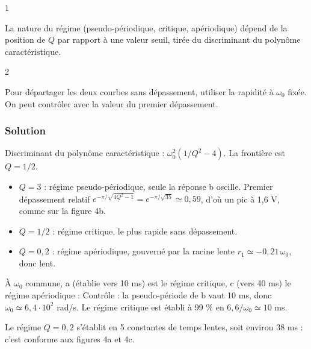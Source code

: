 \documentclass[11pt,a4paper]{article}
\providecommand{\tightlist}{\setlength{\itemsep}{0pt}\setlength{\parskip}{0pt}}
\newcommand{\equationajustee}[1]{%
  \sbox{\boiteequation}{$\displaystyle #1$}%
  \ifdim\wd\boiteequation>\linewidth
    \[\resizebox{\linewidth}{!}{\usebox{\boiteequation}}\]%
  \else
    \[#1\]%
  \fi}
\begin{document}
\begin{indication}{1}

La nature du régime (pseudo-périodique, critique, apériodique) dépend de la position de \(Q\) par rapport à une valeur seuil, tirée du discriminant du polynôme caractéristique.

\end{indication}

\begin{indication}{2}

Pour départager les deux courbes sans dépassement, utiliser la rapidité à \(\omega_0\) fixée. On peut contrôler avec la valeur du premier dépassement.

\end{indication}

\hypertarget{solution-13}{%
\subsubsection{Solution}\label{solution-13}}

Discriminant du polynôme caractéristique : \(\omega_0^2(1/Q^2-4)\). La frontière est \(Q=1/2\).

\begin{itemize}
\tightlist
\item
  \(Q=3\) : régime pseudo-périodique, seule la réponse b oscille. Premier dépassement relatif \(e^{-\pi/\sqrt{4Q^2-1}}=e^{-\pi/\sqrt{35}}\simeq0{,}59\), d'où un pic à 1,6 V, comme sur la figure 4b.
\item
  \(Q=1/2\) : régime critique, le plus rapide sans dépassement.
\item
  \(Q=0{,}2\) : régime apériodique, gouverné par la racine lente \(r_1\simeq-0{,}21\,\omega_0\), donc lent.
\end{itemize}

À \(\omega_0\) commune, a (établie vers 10 ms) est le régime critique, c (vers 40 ms) le régime apériodique :
\equationajustee{\boxed{\begin{aligned}{}&\mathbf a\leftrightarrow0{,}5\\
&\mathbf b\leftrightarrow3\\
&\mathbf c\leftrightarrow0{,}2
\end{aligned}}}
Contrôle : la pseudo-période de b vaut 10 ms, donc \(\omega_0\simeq6{,}4\cdot10^2\) rad/s. Le régime critique est établi à 99 \% en \(6{,}6/\omega_0\simeq10\) ms.

Le régime \(Q=0{,}2\) s'établit en 5 constantes de temps lentes, soit environ 38 ms : c'est conforme aux figures 4a et 4c.
\end{document}
